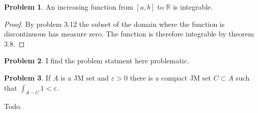 \documentclass[20pt]{article}
\theoremstyle{plain}
\theoremstyle{definition}
\newtheorem*{problem}{Problem}
\newcommand{\reals}{\mathbb{R}}
\begin{document}
\begin{problem}{3.20}
  An increasing function from $[a, b]$ to $\reals$ is integrable.
\end{problem}
\begin{proof}
  By problem 3.12 the subset of the domain where the function is 
  discontinuous has measure zero. The function is therefore integrable by theorem 3.8.
\end{proof}


\begin{problem}{3.21}
	\color{Blue}
	I find the problem statment here problematic.
\end{problem}

\begin{problem}{3.22}
  If $A$ is a JM set and $\varepsilon > 0$ there is a compact JM set $C \subset A$
  such that $\int_{A-C}1 < \varepsilon.$ 
\end{problem}
\color{Blue}
Todo.
\color{Black}
\end{document}
